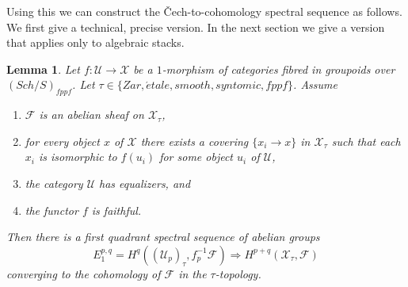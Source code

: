 \documentclass{stacks-project}
\theoremstyle{plain}
\newtheorem{lemma}[subsection]{Lemma}
\theoremstyle{definition}
\theoremstyle{remark}
\numberwithin{equation}{subsection}
\def\Sch{\mathit{Sch}}
\def\etale{{\acute{e}tale}}
\begin{document}
\noindent
Using this we can construct the {\v C}ech-to-cohomology spectral sequence
as follows. We first give a technical, precise version. In the next section
we give a version that applies only to algebraic stacks.

\begin{lemma}
\label{lemma-cech-to-cohomology}
Let $f : \mathcal{U} \to \mathcal{X}$ be a $1$-morphism of categories fibred
in groupoids over $(\Sch/S)_{fppf}$. Let
$\tau \in \{Zar, \etale, smooth, syntomic, fppf\}$.
Assume
\begin{enumerate}
\item $\mathcal{F}$ is an abelian sheaf on $\mathcal{X}_\tau$,
\item for every object $x$ of $\mathcal{X}$ there exists a covering
$\{x_i \to x\}$ in $\mathcal{X}_\tau$ such that each $x_i$ is isomorphic
to $f(u_i)$ for some object $u_i$ of $\mathcal{U}$,
\item the category $\mathcal{U}$ has equalizers, and
\item the functor $f$ is faithful.
\end{enumerate}
Then there is a first quadrant spectral sequence of abelian groups
$$
E_1^{p, q} = H^q((\mathcal{U}_p)_\tau, f_p^{-1}\mathcal{F})
\Rightarrow
H^{p + q}(\mathcal{X}_\tau, \mathcal{F})
$$
converging to the cohomology of $\mathcal{F}$ in the $\tau$-topology.
\end{lemma}
\end{document}
